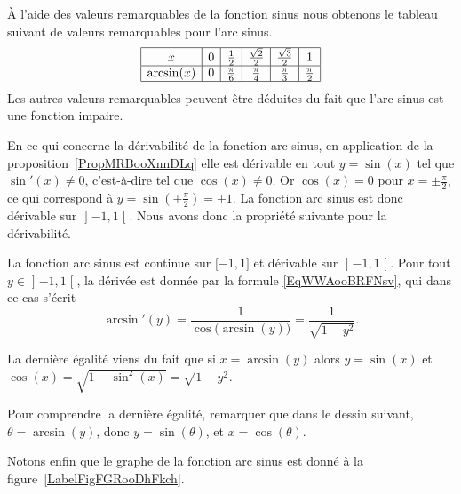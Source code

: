 À l'aide des valeurs remarquables de la fonction sinus nous obtenons le tableau suivant de valeurs remarquables pour l'arc sinus.
\begin{equation*}
	\begin{array}[]{|c|c|c|c|c|c|}
		\hline
		x          & 0 & \frac{ 1 }{2}     & \frac{ \sqrt{2} }{2} & \frac{ \sqrt{3} }{2} & 1                 \\
		\hline
		\arcsin(x) & 0 & \frac{ \pi }{ 6 } & \frac{ \pi }{ 4 }    & \frac{ \pi }{ 3 }    & \frac{ \pi }{ 2 } \\
		\hline
	\end{array}
\end{equation*}
Les autres valeurs remarquables peuvent être déduites du fait que l'arc sinus est une fonction impaire.

En ce qui concerne la dérivabilité de la fonction arc sinus, en application de la proposition~\ref{PropMRBooXnnDLq} elle est dérivable en tout \( y=\sin(x)\) tel que \( \sin'(x)\neq 0\), c'est-à-dire tel que \( \cos(x)\neq 0\). Or \( \cos(x)=0\) pour \( x=\pm\frac{ \pi }{2}\), ce qui correspond à \( y=\sin(\pm\frac{ \pi }{2})=\pm 1\). La fonction arc sinus est donc dérivable sur \( \mathopen] -1 , 1 \mathclose[\). Nous avons donc la propriété suivante pour la dérivabilité.

	\begin{proposition}
		La fonction arc sinus est continue sur \( \mathopen[ -1 , 1 \mathclose]\) et dérivable sur \( \mathopen] -1 , 1 \mathclose[\). Pour tout \( y\in\mathopen] -1 , 1 \mathclose[\), la dérivée est donnée par la formule \eqref{EqWWAooBRFNsv}, qui dans ce cas s'écrit
		\begin{equation}
			\arcsin'(y)=\frac{1}{ \cos\big( \arcsin(y) \big) }=\frac{1}{ \sqrt{1-y^2} }.
		\end{equation}
	\end{proposition}
	La dernière égalité viens du fait que si \( x=\arcsin(y)\) alors \( y = \sin(x)\) et \( \cos(x)= \sqrt{1-\sin^2(x)} = \sqrt{1-y^2}\).

	Pour comprendre la dernière égalité, remarquer que dans le dessin suivant, \( \theta=\arcsin(y)\), donc \( y = \sin(\theta)\), et \( x=\cos(\theta)\).
	\begin{center}
		
	\end{center}

	Notons enfin que le graphe de la fonction arc sinus est donné à la figure~\ref{LabelFigFGRooDhFkch}. %
	\newcommand{\CaptionFigFGRooDhFkch}{Le graphe de la fonction \( x\mapsto \arcsin(x)\)}
	

